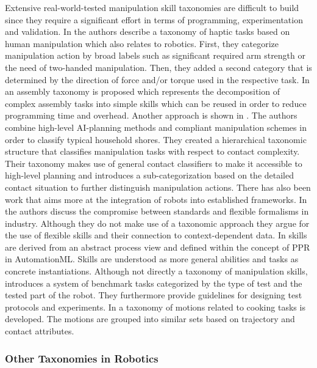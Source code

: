 Extensive real-world-tested manipulation skill taxonomies are difficult to build since they require a significant effort in terms of programming, experimentation and validation.
In \cite{Bloomfield.2003} the authors describe a taxonomy of haptic tasks based on human manipulation which also relates to robotics. First, they categorize manipulation action by broad labels such as significant required arm strength or the need of two-handed manipulation. Then, they added a second category that is determined by the direction of force and/or torque used in the respective task.
In \cite{Huckaby.2012} an assembly taxonomy is proposed which represents the decomposition of complex assembly tasks into simple skills which can be reused in order to reduce programming time and overhead.
Another approach is shown in \cite{Leidner.2015}. The authors combine high-level AI-planning methods and compliant manipulation schemes in order to classify typical household shores. They created a hierarchical taxonomic structure that classifies manipulation tasks with respect to contact complexity. Their taxonomy makes use of general contact classifiers to make it accessible to high-level planning and introduces a sub-categorization based on the detailed contact situation to further distinguish manipulation actions.
There has also been work that aims more at the integration of robots into established frameworks. In \cite{Bjorkelund.2011} the authors discuss the compromise between standards and flexible formalisms in industry. Although they do not make use of a taxonomic approach they argue for the use of flexible skills and their connection to context-dependent data. In \cite{Pfrommer.2013} skills are derived from an abstract process view and defined within the concept of PPR in AutomationML. Skills are understood as more general abilities and tasks as concrete instantiations.
Although not directly a taxonomy of manipulation skills, \cite{HuamanQuispe.2018} introduces a system of benchmark tasks categorized by the type of test and the tested part of the robot.
They furthermore provide guidelines for designing test protocols and experiments.
In \cite{Paulius.2019} a taxonomy of motions related to cooking tasks is developed.
The motions are grouped into similar sets based on trajectory and contact attributes.


\subsubsection{Other Taxonomies in Robotics}

